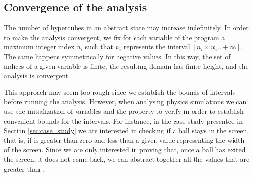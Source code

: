 \vspace{-10pt}
\subsection{Convergence of the analysis}
\vspace{-5pt}
The number of hypercubes in an abstract state may increase indefinitely. In order to make the analysis convergent, we fix for each variable of the program a maximum integer index $n_i$ such that $n_i$ represents the interval $[n_i \times w_i .. +\infty]$. The same happens symmetrically for negative values. In this way, the set of indices of a given variable is finite, the resulting domain has finite height, and the analysis is convergent.

This approach may seem too rough since we establish the bounds of intervals before running the analysis. However, 
when analysing physics simulations we can use the initialization of variables and the property to verify in order to establish convenient bounds for the intervals. For instance, in the case study presented in Section \ref{sec:case_study} we are interested in checking if a ball stays in the screen, that is, if  is greater than zero and less than a given value  representing the width of the screen. Since we are only interested in proving that, once a ball has exited the screen, it does not come back, we can abstract together all the values that are greater than .



